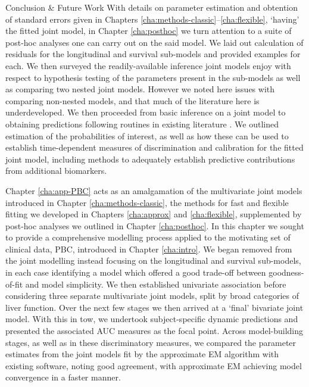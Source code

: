 \begin{chapter}{\label{cha:conclusion}Conclusion \& Future Work}
With details on parameter estimation and obtention of standard errors given in Chapters \ref{cha:methods-classic}--\ref{cha:flexible}, \ie `having' the fitted joint model, in Chapter \ref{cha:posthoc} we turn attention to a suite of post-hoc analyses one can carry out on the said model. We laid out calculation of residuals for the longitudinal and survival sub-models and provided examples for each. We then surveyed the readily-available inference joint models enjoy with respect to hypothesis testing of the parameters present in the sub-models as well as comparing two nested joint models. However we noted here issues with comparing non-nested models, and that much of the literature here is underdeveloped. We then proceeded from basic inference on a joint model to obtaining predictions following routines in existing literature \citep{Rizopoulos2012}. We outlined estimation of the probabilities of interest, as well as how these can be used to establish time-dependent measures of discrimination and calibration for the fitted joint model, including methods to adequately establish predictive contributions from \eg additional biomarkers.

Chapter \ref{cha:app-PBC} acts as an amalgamation of the multivariate joint models introduced in Chapter \ref{cha:methods-classic}, the methods for fast and flexible fitting we developed in Chapters \ref{cha:approx} and \ref{cha:flexible}, supplemented by post-hoc analyses we outlined in Chapter \ref{cha:posthoc}. In this chapter we sought to provide a comprehensive modelling process applied to the motivating set of clinical data, PBC, introduced in Chapter \ref{cha:intro}. We began removed from the joint modelling instead focusing on the longitudinal and survival sub-models, in each case identifying a model which offered a good trade-off between goodness-of-fit and model simplicity. We then established univariate association before considering three separate multivariate joint models, split by broad categories of liver function. Over the next few stages we then arrived at a `final' bivariate joint model. With this in tow, we undertook subject-specific dynamic predictions and presented the associated AUC measures as the focal point. Across model-building stages, as well as in these discriminatory measures, we compared the parameter estimates from the joint models fit by the approximate EM algorithm with existing software, noting good agreement, with approximate EM achieving model convergence in a faster manner.


\end{chapter}
